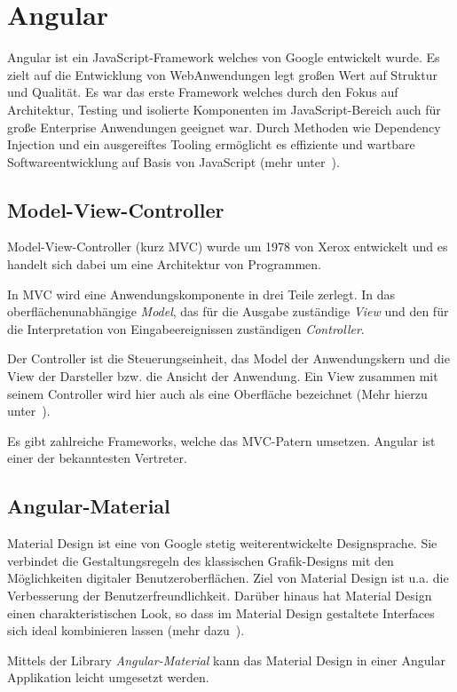 \section{Angular}
Angular ist ein JavaScript-Framework welches von Google entwickelt wurde. Es zielt auf die Entwicklung von
WebAnwendungen legt großen Wert auf Struktur und Qualität. Es war das erste Framework welches durch den Fokus auf
Architektur, Testing und isolierte Komponenten im JavaScript-Bereich auch für große Enterprise Anwendungen geeignet war.
Durch Methoden wie Dependency Injection und ein ausgereiftes Tooling ermöglicht es effiziente und wartbare
Softwareentwicklung auf Basis von JavaScript (mehr unter~\cite{book_grundlagen_angular}).

\subsection{Model-View-Controller}
Model-View-Controller (kurz MVC) wurde um 1978 von Xerox entwickelt und es handelt sich dabei um eine Architektur von
Programmen.

In MVC wird eine Anwendungskomponente in drei Teile zerlegt. In das oberflächenunabhängige \textit{Model}, das für die
Ausgabe zuständige \textit{View} und den für die Interpretation von Eingabeereignissen zuständigen \textit{Controller}.

Der Controller ist die Steuerungseinheit, das Model der Anwendungskern und die View der Darsteller bzw. die Ansicht der
Anwendung. Ein View zusammen mit seinem Controller wird hier auch als eine Oberfläche bezeichnet (Mehr hierzu
unter~\cite{book_grundlagen_mvc}).

Es gibt zahlreiche Frameworks, welche das MVC-Patern umsetzen. Angular ist einer der bekanntesten Vertreter.

\subsection{Angular-Material}
Material Design ist eine von Google stetig weiterentwickelte Designsprache. Sie verbindet die Gestaltungsregeln des
klassischen Grafik-Designs mit den Möglichkeiten digitaler Benutzeroberflächen. Ziel von Material Design ist u.a. die
Verbesserung der Benutzerfreundlichkeit. Darüber hinaus hat Material Design einen charakteristischen Look, so dass im
Material Design gestaltete Interfaces sich ideal kombinieren lassen (mehr dazu~\cite{online_grundlagen_materialdesign}).

Mittels der Library \textit{Angular-Material} kann das Material Design in einer Angular Applikation leicht umgesetzt
werden.

